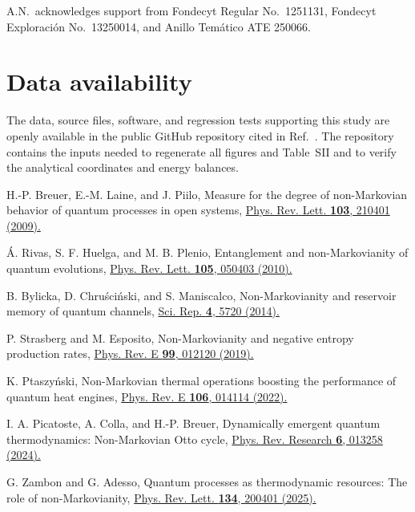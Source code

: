 \documentclass[reprint,superscriptaddress,floatfix,amsmath,amssymb,prresearch,aps]{revtex4-2}
\newcommand{\doilink}[2]{\href{https://doi.org/#1}{#2}}
\begin{document}
A.N.\ acknowledges support from Fondecyt Regular No.~1251131, Fondecyt
Exploraci\'on No.~13250014, and Anillo Tem\'atico ATE 250066.

\section*{Data availability}

The data, source files, software, and regression tests supporting this study
are openly available in the public GitHub repository cited in
Ref.~\cite{DataArchive}. The repository contains the inputs needed to
regenerate all figures and Table~SII and to verify the analytical coordinates
and energy balances.

\begin{thebibliography}{99}

H.-P. Breuer, E.-M. Laine, and J. Piilo,
Measure for the degree of non-Markovian behavior of quantum processes in open
systems,
\doilink{10.1103/PhysRevLett.103.210401}{Phys. Rev. Lett. \textbf{103}, 210401 (2009).}

\'A. Rivas, S. F. Huelga, and M. B. Plenio,
Entanglement and non-Markovianity of quantum evolutions,
\doilink{10.1103/PhysRevLett.105.050403}{Phys. Rev. Lett. \textbf{105}, 050403 (2010).}

B. Bylicka, D. Chru\'sci\'nski, and S. Maniscalco,
Non-Markovianity and reservoir memory of quantum channels,
\doilink{10.1038/srep05720}{Sci. Rep. \textbf{4}, 5720 (2014).}

P. Strasberg and M. Esposito,
Non-Markovianity and negative entropy production rates,
\doilink{10.1103/PhysRevE.99.012120}{Phys. Rev. E \textbf{99}, 012120 (2019).}

K. Ptaszy\'nski,
Non-Markovian thermal operations boosting the performance of quantum heat
engines,
\doilink{10.1103/PhysRevE.106.014114}{Phys. Rev. E \textbf{106}, 014114 (2022).}

I. A. Picatoste, A. Colla, and H.-P. Breuer,
Dynamically emergent quantum thermodynamics: Non-Markovian Otto cycle,
\doilink{10.1103/PhysRevResearch.6.013258}{Phys. Rev. Research \textbf{6}, 013258 (2024).}

G. Zambon and G. Adesso,
Quantum processes as thermodynamic resources: The role of non-Markovianity,
\doilink{10.1103/PhysRevLett.134.200401}{Phys. Rev. Lett. \textbf{134}, 200401 (2025).}


\end{thebibliography}
\end{document}
